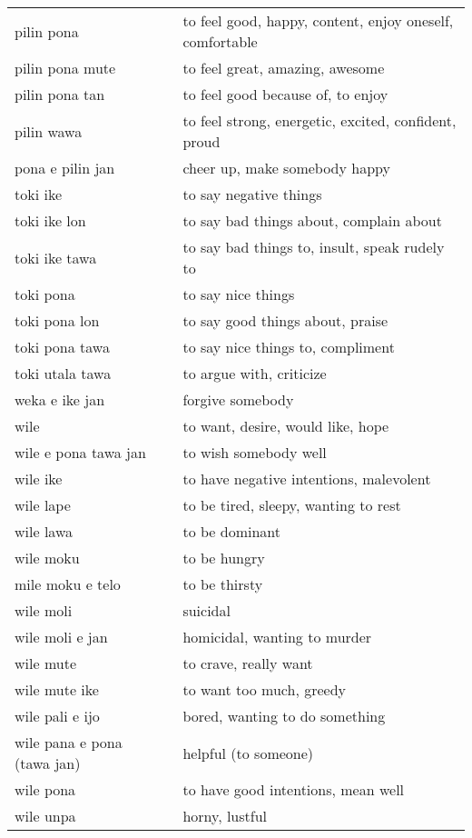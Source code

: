 \begin{supertabular}{p{4,5cm}|ll}
pilin pona && to feel good, happy, content, enjoy oneself, comfortable \\ 
pilin pona mute && to feel great, amazing, awesome \\
pilin pona tan && to feel good because of, to enjoy \\
pilin wawa && to feel strong, energetic, excited, confident, proud \\ 
pona e pilin jan && cheer up, make somebody happy \\
toki ike && to say negative things \\
toki ike lon && to say bad things about, complain about \\
toki ike tawa && to say bad things to, insult, speak rudely to \\
toki pona && to say nice things \\
toki pona lon && to say good things about, praise \\ 
toki pona tawa && to say nice things to, compliment \\
toki utala tawa && to argue with, criticize \\
weka e ike jan && forgive somebody \\
wile && to want, desire, would like, hope \\
wile e pona tawa jan && to wish somebody well \\
wile ike && to have negative intentions, malevolent \\
wile lape && to be tired, sleepy, wanting to rest \\
wile lawa && to be dominant \\ 
wile moku && to be hungry \\
mile moku e telo && to be thirsty \\
wile moli && suicidal \\
wile moli e jan && homicidal, wanting to murder \\
wile mute && to crave, really want \\
wile mute ike && to want too much, greedy \\
wile pali e ijo && bored, wanting to do something \\ 
wile pana e pona (tawa jan) && helpful (to someone) \\
wile pona && to have good intentions, mean well \\
wile unpa && horny, lustful \\
\end{supertabular} \\
%
%
